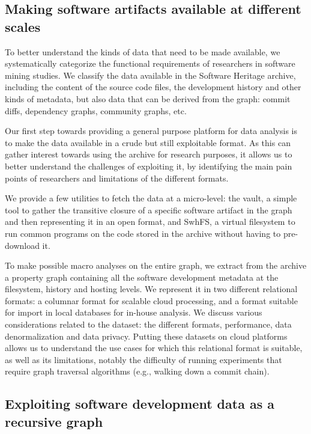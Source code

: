 \subsection*{Making software artifacts available at different scales}

To better understand the kinds of data that need to be made available, we
systematically categorize the functional requirements of researchers in
software mining studies.  We classify the data available in the Software
Heritage archive, including the content of the source code files, the
development history and other kinds of metadata, but also data that can be
derived from the graph: commit diffs, dependency graphs, community graphs, etc.

Our first step towards providing a general purpose platform for data analysis
is to make the data available in a crude but still exploitable format. As this
can gather interest towards using the archive for research purposes, it
allows us to better understand the challenges of exploiting it, by identifying
the main pain points of researchers and limitations of the different formats.

We provide a few utilities to fetch the data at a micro-level: the vault, a
simple tool to gather the transitive closure of a specific software artifact in
the graph and then representing it in an open format, and SwhFS, a virtual
filesystem to run common programs on the code stored in the archive without
having to pre-download it.

To make possible macro analyses on the entire graph, we extract from the
archive a property graph containing all the software development metadata at
the filesystem, history and hosting levels. We represent it in two different
relational formats: a columnar format for scalable cloud processing, and a
format suitable for import in local databases for in-house analysis. We discuss
various considerations related to the dataset: the different formats,
performance, data denormalization and data privacy.
Putting these datasets on cloud platforms allows us to understand the use cases
for which this relational format is suitable, as well as its limitations,
notably the difficulty of running experiments that require graph traversal
algorithms (e.g., walking down a commit chain).

\subsection*{Exploiting software development data as a recursive graph}

